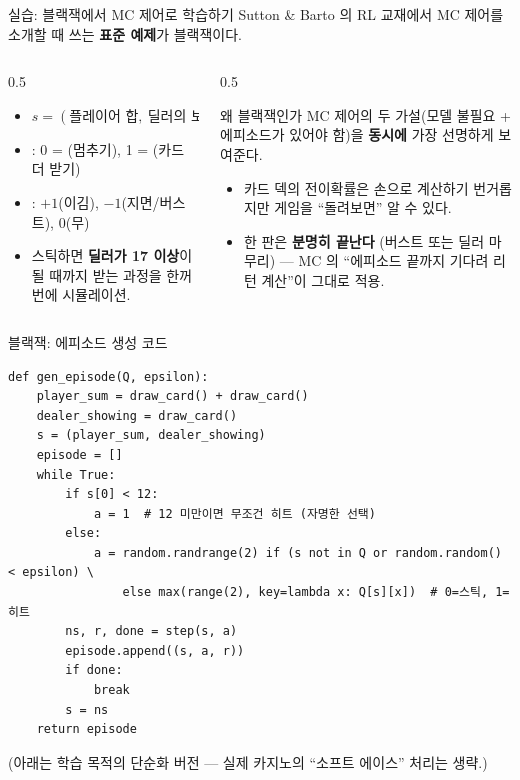 \documentclass[aspectratio=169,11pt]{beamer}
\begin{document}
\begin{frame}{실습: 블랙잭에서 MC 제어로 학습하기}
  Sutton \& Barto 의 RL 교재에서 MC 제어를 소개할 때 쓰는
  \textbf{표준 예제}가 블랙잭이다.
  \begin{columns}[T]
    \begin{column}{0.5\textwidth}
      \begin{itemize}
        \item {} $s = (\text{플레이어 합},\ \text{딜러의
          보이는 카드})$
        \item {}: 0 = (멈추기), 1 = (카드
          더 받기)
        \item {}: $+1$(이김), $-1$(지면/버스트), $0$(무)
        \item 스틱하면 \textbf{딜러가 17 이상}이 될 때까지
          받는 과정을 한꺼번에 시뮬레이션.
      \end{itemize}
    \end{column}
    \begin{column}{0.5\textwidth}
      \begin{block}{왜 블랙잭인가}
        MC 제어의 두 가설(모델 불필요 + 에피소드가 있어야
        함)을 \textbf{동시에} 가장 선명하게 보여준다.
        \begin{itemize}
          \item 카드 덱의 전이확률은 손으로 계산하기 번거롭지만
            게임을 ``돌려보면'' 알 수 있다.
          \item 한 판은 \textbf{분명히 끝난다} (버스트 또는
            딜러 마무리) --- MC 의 ``에피소드 끝까지 기다려
            리턴 계산''이 그대로 적용.
        \end{itemize}
      \end{block}
    \end{column}
  \end{columns}
\end{frame}

\begin{frame}[fragile]{블랙잭: 에피소드 생성 코드}
\begin{lstlisting}
def gen_episode(Q, epsilon):
    player_sum = draw_card() + draw_card()
    dealer_showing = draw_card()
    s = (player_sum, dealer_showing)
    episode = []
    while True:
        if s[0] < 12:
            a = 1  # 12 미만이면 무조건 히트 (자명한 선택)
        else:
            a = random.randrange(2) if (s not in Q or random.random() < epsilon) \
                else max(range(2), key=lambda x: Q[s][x])  # 0=스틱, 1=히트
        ns, r, done = step(s, a)
        episode.append((s, a, r))
        if done:
            break
        s = ns
    return episode
\end{lstlisting}
  {\footnotesize (아래는 학습 목적의 단순화 버전 --- 실제
  카지노의 ``소프트 에이스'' 처리는 생략.)}
\end{frame}
\end{document}

